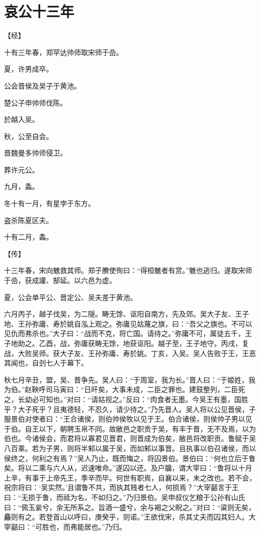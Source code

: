 \documentclass[a4paper,12pt,UTF8,twoside]{ctexbook}
\begin{document}
\chapter{哀公十三年}




【经】

十有三年春，郑罕达帅师取宋师于嵒。

夏，许男成卒。

公会晋侯及吴子于黄池。

楚公子申帅师伐陈。

於越入吴。

秋，公至自会。

晋魏曼多帅师侵卫。

葬许元公。

九月，螽。

冬十有一月，有星孛于东方。

盗杀陈夏区夫。

十有二月，螽。

【传】

十三年春，宋向魋救其师。郑子賸使徇曰：“得桓魋者有赏。”魋也逃归。遂取宋师于嵒，获成讙、郜延。以六邑为虚。

夏，公会单平公、晋定公、吴夫差于黄池。

六月丙子，越子伐吴，为二隧。畴无馀、讴阳自南方，先及郊。吴大子友、王子地、王孙弥庸、寿於姚自泓上观之。弥庸见姑蔑之旗，曰：“吾父之旗也。不可以见仇而弗杀也。”大子曰：“战而不克，将亡国。请待之。”弥庸不可，属徒五千，王子地助之。乙酉，战，弥庸获畴无馀，地获讴阳。越子至，王子地守。丙戌，复战，大败吴师。获大子友、王孙弥庸、寿於姚。丁亥，入吴。吴人告败于王，王恶其闻也，自刭七人于幕下。

秋七月辛丑，盟，吴、晋争先。吴人曰：“于周室，我为长。”晋人曰：“于姬姓，我为伯。”赵鞅呼司马寅曰：“日旰矣，大事未成，二臣之罪也。建鼓整列，二臣死之，长幼必可知也。”对曰：“请姑视之。”反曰：“肉食者无墨。今吴王有墨，国胜乎？大子死乎？且夷德轻，不忍久，请少待之。”乃先晋人。吴人将以公见晋侯，子服景伯对使者曰：“王合诸侯，则伯帅侯牧以见于王。伯合诸侯，则侯帅子男以见于伯。自王以下，朝聘玉帛不同。故敝邑之职贡于吴，有丰于晋，无不及焉，以为伯也。今诸侯会，而君将以寡君见晋君，则晋成为伯矣，敝邑将改职贡。鲁赋于吴八百乘。若为子男，则将半邾以属于吴，而如邾以事晋。且执事以伯召诸侯，而以侯终之，何利之有焉？”吴人乃止，既而悔之，将囚景伯。景伯曰：“何也立后于鲁矣。将以二乘与六人从，迟速唯命。”遂囚以还。及户牖，谓大宰曰：“鲁将以十月上辛，有事于上帝先王，季辛而毕。何世有职焉，自襄以来，未之改也。若不会，祝宗将曰：‘吴实然。’且谓鲁不共，而执其贱者七人，何损焉？”大宰嚭言于王曰：“无损于鲁，而祗为名，不如归之。”乃归景伯。吴申叔仪乞粮于公孙有山氏曰：“佩玉繠兮，余无所系之。旨酒一盛兮，余与褐之父睨之。”对曰：“粱则无矣，麤则有之。若登首山以呼曰，庚癸乎，则诺。”王欲伐宋，杀其丈夫而囚其妇人。大宰嚭曰：“可胜也，而弗能居也。”乃归。
\end{document}
